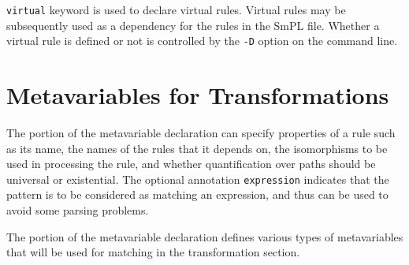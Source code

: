 \texttt{virtual} keyword is used to declare virtual rules. Virtual
rules may be subsequently used as a dependency for the rules in the
SmPL file. Whether a virtual rule is defined or not is controlled by
the \texttt{-D} option on the command line.


\section{Metavariables for Transformations}

The  portion of the metavariable declaration can specify
properties of a rule such as its name, the names of the rules that it
depends on, the isomorphisms to be used in processing the rule, and whether
quantification over paths should be universal or existential.  The optional
annotation {\tt expression} indicates that the pattern is to be considered
as matching an expression, and thus can be used to avoid some parsing
problems.

The  portion of the metavariable declaration defines various
types of metavariables that will be used for matching in the transformation
section.

\begin{grammar}








\end{grammar}


